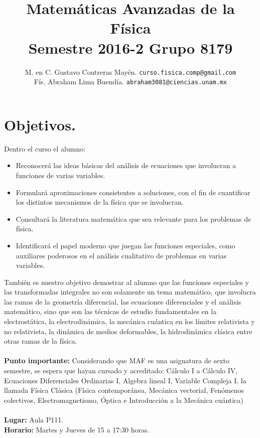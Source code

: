 \documentclass[12pt]{article}
\author{M. en C. Gustavo Contreras Mayén. \texttt{curso.fisica.comp@gmail.com}\\
Fís. Abraham Lima Buendía. \texttt{abraham3081@ciencias.unam.mx}}
\title{Matemáticas Avanzadas de la Física \\ {\large Semestre 2016-2 Grupo 8179}}
\date{ }
\begin{document}
\vspace{-4cm}
\renewcommand\labelenumii{\theenumi.{\arabic{enumii}}}
\maketitle
\fontsize{14}{14}\selectfont
\section{Objetivos.}
Dentro el curso el alumno:
\begin{itemize}
\setlength{\itemsep}{0mm}
\item Reconocerá las ideas básicas del análisis de ecuaciones que involucran a funciones de varias variables.
\item Formulará aproximaciones consistentes a soluciones, con el fin de cuantificar los distintos mecanismos de la física que se involucran.
\item Consultará la literatura matemática que sea relevante para los problemas de física.
\item Identificará el papel moderno que juegan las funciones especiales, como auxiliares poderosos en el análisis cualitativo de problemas en varias variables.
\end{itemize}
También es nuestro objetivo demostrar al alumno que las funciones especiales y las transformadas integrales no son solamente un tema matemático, que involucra las ramas de la geometría diferencial, las ecuaciones diferenciales y el análisis matemático, sino que son las técnicas de estudio fundamentales en la electrostática, la electrodinámica, la mecánica cuántica en los límites relativista y  no relativista, la dinámica de medios deformables, la hidrodinámica clásica entre otras ramas de la física.
\\
\\
\textbf{Punto importante: } Considerando que MAF es una asignatura de sexto semestre, se espera que hayan cursado y acreditado: Cálculo I a Cálculo IV, Ecuaciones Diferenciales Ordinarias I, Algebra lineal I, Variable Compleja I, la llamada Física Clásica (Física contemporánea, Mecánica vectorial, Fenómenos colectivos, Electromagnetismo, Óptica e Introducción a la Mecánica cuántica)
\\
\\
\textbf{Lugar: }Aula P111.
\\
\textbf{Horario: } Martes y Jueves de 15 a 17:30 horas.
\end{document}
